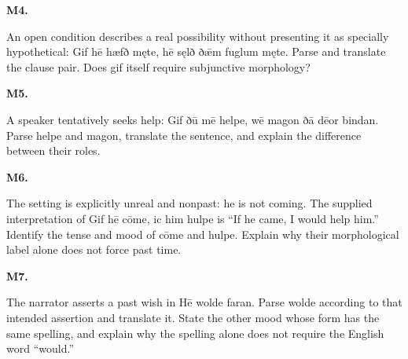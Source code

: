 \par\begin{minipage}{\linewidth}\raggedright
\textbf{M4.}

An open condition describes a real possibility without presenting it as specially hypothetical: Gif hē hæfð męte, hē sęlð ðǣm fuglum męte. Parse and translate the clause pair. Does gif itself require subjunctive morphology?

\end{minipage}\par\addvspace{4pt}

\par\begin{minipage}{\linewidth}\raggedright
\textbf{M5.}

A speaker tentatively seeks help: Gif ðū mē helpe, wē magon ðā dēor bindan. Parse helpe and magon, translate the sentence, and explain the difference between their roles.

\end{minipage}\par\addvspace{4pt}

\par\begin{minipage}{\linewidth}\raggedright
\textbf{M6.}

The setting is explicitly unreal and nonpast: he is not coming. The supplied interpretation of Gif hē cōme, ic him hulpe is “If he came, I would help him.” Identify the tense and mood of cōme and hulpe. Explain why their morphological label alone does not force past time.

\end{minipage}\par\addvspace{4pt}

\par\begin{minipage}{\linewidth}\raggedright
\textbf{M7.}

The narrator asserts a past wish in Hē wolde faran. Parse wolde according to that intended assertion and translate it. State the other mood whose form has the same spelling, and explain why the spelling alone does not require the English word “would.”

\end{minipage}\par\addvspace{4pt}

